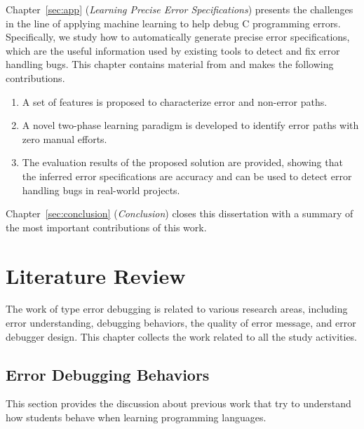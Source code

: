 \documentclass[12pt]{report}	%
\begin{document}
Chapter~\ref{sec:app} (\emph{Learning Precise Error Specifications}) 
presents the challenges in the line of applying machine learning to help debug C programming errors.
Specifically, we study how to automatically generate precise error specifications,
which are the useful information used by existing tools to detect and fix error handling bugs.
This chapter contains material from \cite{Wu:2019:GPE:3366395.3360586} and makes the following contributions.

\begin{enumerate}
\item A set of features is proposed to characterize error and non-error paths.

\item A novel two-phase learning paradigm is developed to identify error paths with zero manual efforts.

\item The evaluation results of the proposed solution are provided, showing that the inferred error specifications are accuracy
and can be used to detect error handling bugs in real-world projects.

\end{enumerate}

Chapter~\ref{sec:conclusion} (\emph{Conclusion}) closes this dissertation with a summary of the most important contributions of this work.


\chapter{Literature Review}
\label{sec:review}

The work of type error debugging is related to various research areas, including
error understanding, debugging behaviors, the quality of error message,
and error debugger design.
This chapter collects the work related to all the study activities.

\section{Error Debugging Behaviors}
\label{sec:review:behavior}

This section provides the discussion about previous work that try to understand how students behave when learning programming languages.
\end{document}
